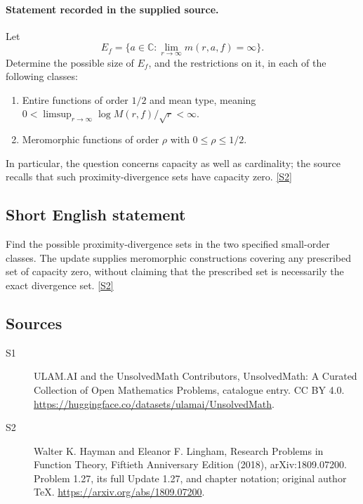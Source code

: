 \documentclass[11pt]{article}
\newcommand{\sref}[2]{\hyperlink{source:#1:#2}{[S#2]}}
\begin{document}
\paragraph{Statement recorded in the supplied source.}
Let
\[
 E_f=\{a\in\mathbb C:\lim_{r\to\infty}m(r,a,f)=\infty\}.
\]
Determine the possible size of $E_f$, and the restrictions on it, in each of the following classes:
\begin{enumerate}
\item Entire functions of order $1/2$ and mean type, meaning $0<\limsup_{r\to\infty}\log M(r,f)/\sqrt r<\infty$.
\item Meromorphic functions of order $\rho$ with $0\le\rho\le1/2$.
\end{enumerate}
In particular, the question concerns capacity as well as cardinality; the source recalls that such proximity-divergence sets have capacity zero. \sref{statement}{2}
\subsection{Short English statement}
Find the possible proximity-divergence sets in the two specified small-order classes. The update supplies meromorphic constructions covering any prescribed set of capacity zero, without claiming that the prescribed set is necessarily the exact divergence set. \sref{statement}{2}
\subsection{Sources}
\begin{description}
\item[\hypertarget{source:statement:1}{S1}] ULAM.AI and the UnsolvedMath Contributors, UnsolvedMath: A Curated Collection of Open Mathematics Problems, catalogue entry. CC BY 4.0. \url{https://huggingface.co/datasets/ulamai/UnsolvedMath}.
\item[\hypertarget{source:statement:2}{S2}] Walter K. Hayman and Eleanor F. Lingham, Research Problems in Function Theory, Fiftieth Anniversary Edition (2018), arXiv:1809.07200. Problem 1.27, its full Update 1.27, and chapter notation; original author TeX. \url{https://arxiv.org/abs/1809.07200}.
\end{description}
\label{end:statement}
\end{document}
